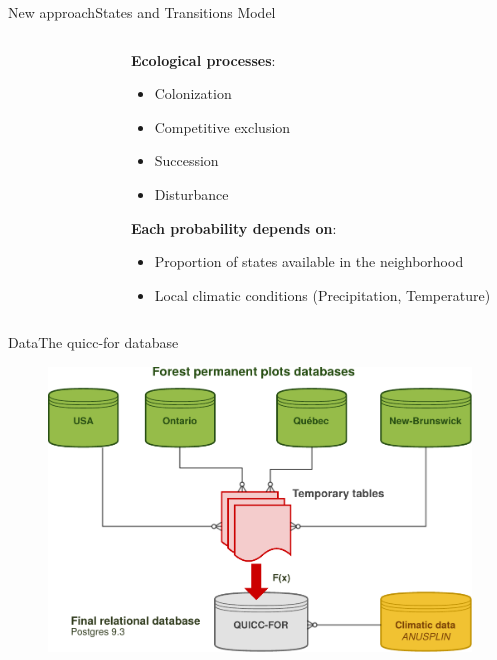 \documentclass[10pt,aspectratio=149]{beamer}
\begin{document}

\begin{frame}{New approach}{States and Transitions Model}


\begin{columns}[t]
	\begin{column}[t]{.40\paperwidth}
		\begin{figure}
			\small{}
		\end{figure}
	\end{column}
	\begin{column}[t]{.50\paperwidth}
	\textbf{Ecological processes}:
	\begin{itemize}
		\item Colonization
		\item Competitive exclusion
		\item Succession
		\item Disturbance
	\end{itemize}
	\vspace{1em}
	\textbf{Each probability depends on}:
		\begin{itemize}
			\item Proportion of states available in the neighborhood
			\item Local climatic conditions (Precipitation, Temperature)
		\end{itemize}
	\end{column}
\end{columns}

\end{frame}



\begin{frame}{Data}{The quicc-for database}
	\vspace{-1em}
\begin{figure}
	\includegraphics[width=.70\paperwidth]{Figs/QUICCFOR.pdf}
\end{figure}

\end{frame}
\end{document}
